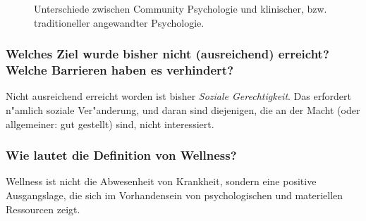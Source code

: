 \begin{figure}[tbh]
        \begin{center}
                \caption{Unterschiede zwischen Community Psychologie und klinischer, bzw. traditioneller angewandter Psychologie.}
                \label{fig:prilleltensky1}
        \end{center}
\end{figure}

\subsubsection{Welches Ziel wurde bisher nicht (ausreichend) erreicht? Welche Barrieren haben es verhindert?}
Nicht ausreichend erreicht worden ist bisher \emph{Soziale Gerechtigkeit}. Das erfordert n"amlich soziale Ver"anderung, und daran sind diejenigen, die an der Macht (oder allgemeiner: gut gestellt) sind, nicht interessiert. 

\subsubsection{Wie lautet die Definition von Wellness?}
Wellness ist nicht die Abwesenheit von Krankheit, sondern eine positive Ausgangslage, die sich im Vorhandensein von psychologischen und materiellen Ressourcen zeigt.

